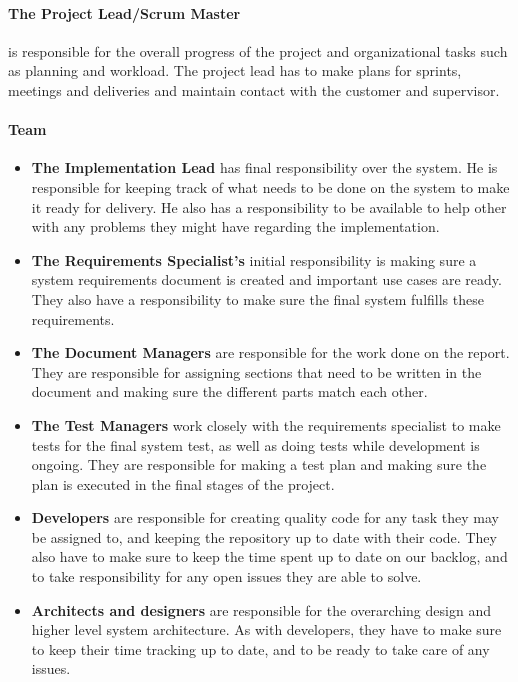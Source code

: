 \paragraph{The Project Lead/Scrum Master} is responsible for the overall progress of the project and organizational tasks such as planning and workload. The project lead has to make plans for sprints, meetings and deliveries and maintain contact with the customer and supervisor.

\paragraph{Team}
\begin{itemize}
    \item \textbf{The Implementation Lead} has  final responsibility over the system. He is responsible for keeping track of what needs to be done on the system to make it ready for delivery. He also has a responsibility to be available to help other with any problems they might have regarding the implementation.
    \item \textbf{The Requirements Specialist's} initial responsibility is making sure a system requirements document is created and important use cases are ready. They also have a responsibility to make sure the final system fulfills these requirements.
    \item \textbf{The Document Managers} are responsible for the work done on the report. They are responsible for assigning sections that need to be written in the document and making sure the different parts match each other.
    \item \textbf{The Test Managers} work closely with the requirements specialist to make tests for the final system test, as well as doing tests while development is ongoing. They are responsible for making a test plan and making sure the plan is executed in the final stages of the project.
    \item \textbf{Developers} are responsible for creating quality code for any task they may be assigned to, and keeping the repository up to date with their code. They also have to make sure to keep the time spent up to date on our backlog, and to take responsibility for any open issues they are able to solve.
    \item \textbf{Architects and designers} are responsible for the overarching design and higher level system architecture. As with developers, they have to make sure to keep their time tracking up to date, and to be ready to take care of any issues.
\end{itemize}

